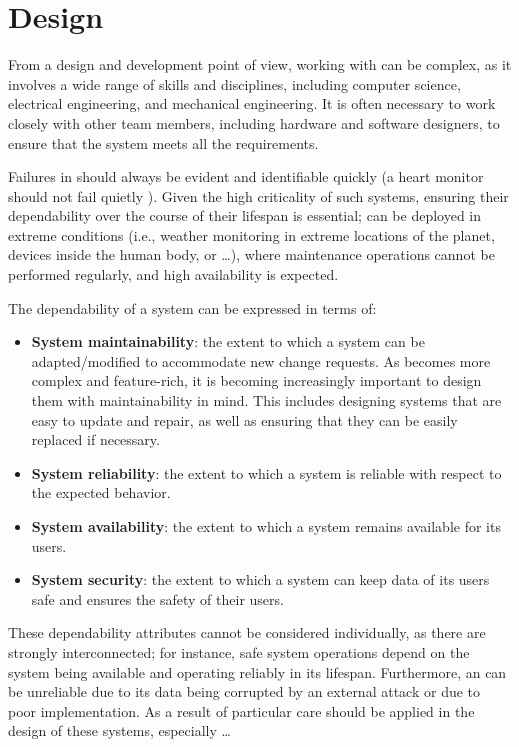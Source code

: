 \section{Design}
From a design and development point of view, working with \ess can be complex, as it involves a wide range of skills and disciplines, including computer science, electrical engineering, and mechanical engineering. It is often necessary to work closely with other team members, including hardware and software designers, to ensure that the system meets all the requirements.

Failures in \ess should always be evident and identifiable quickly (a heart monitor should not fail quietly \cite{MakingEmbeddedSystems}). Given the high criticality of such systems, ensuring their dependability over the course of their lifespan is essential; \ess can be deployed in extreme conditions (i.e., weather monitoring in extreme locations of the planet, devices inside the human body, or \dots), where maintenance operations cannot be performed regularly,  and high availability is expected. 

The dependability of a system can be expressed in terms of:
\begin{itemize}
    \item \textbf{System maintainability}: the extent to which a system can be adapted/modified to accommodate new change requests. As \ess becomes more complex and feature-rich, it is becoming increasingly important to design them with maintainability in mind. This includes designing systems that are easy to update and repair, as well as ensuring that they can be easily replaced if necessary.
    \item \textbf{System reliability}: the extent to which a system is reliable with respect to the expected behavior.
    \item \textbf{System availability}: the extent to which a system remains available for its users.
    \item \textbf{System security}: the extent to which a system can keep data of its users safe and ensures the safety of their users.
\end{itemize}

These dependability attributes cannot be considered individually, as there are strongly interconnected; for instance, safe system operations depend on the system being available and operating reliably in its lifespan. Furthermore, an \es can be unreliable due to its data being corrupted by an external attack or due to poor implementation. As a result of particular care should be applied in the design of these systems, especially \dots 


